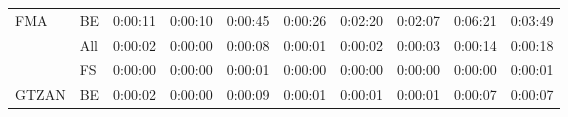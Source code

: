 \begin{table}[H]
{\begin{tabular}{llllllllll}
    \multirow{-3}{*}{FMA}   & \multicolumn{1}{l|}{\cellcolor[HTML]{EFEFEF}BE}  & \cellcolor[HTML]{EFEFEF}0:00:11 & \cellcolor[HTML]{EFEFEF}0:00:10 & \cellcolor[HTML]{EFEFEF}0:00:45 & \cellcolor[HTML]{EFEFEF}0:00:26 & \cellcolor[HTML]{EFEFEF}0:02:20 & \cellcolor[HTML]{EFEFEF}0:02:07 & \cellcolor[HTML]{EFEFEF}0:06:21 & \cellcolor[HTML]{EFEFEF}0:03:49 \\ \cline{1-2}
                            & \multicolumn{1}{l|}{All}                         & 0:00:02                         & 0:00:00                         & 0:00:08                         & 0:00:01                         & 0:00:02                         & 0:00:03                         & 0:00:14                         & 0:00:18                         \\
                            & \multicolumn{1}{l|}{\cellcolor[HTML]{EFEFEF}FS}  & \cellcolor[HTML]{EFEFEF}0:00:00 & \cellcolor[HTML]{EFEFEF}0:00:00 & \cellcolor[HTML]{EFEFEF}0:00:01 & \cellcolor[HTML]{EFEFEF}0:00:00 & \cellcolor[HTML]{EFEFEF}0:00:00 & \cellcolor[HTML]{EFEFEF}0:00:00 & \cellcolor[HTML]{EFEFEF}0:00:00 & \cellcolor[HTML]{EFEFEF}0:00:01 \\
    \multirow{-3}{*}{GTZAN} & \multicolumn{1}{l|}{BE}                          & 0:00:02                         & 0:00:00                         & 0:00:09                         & 0:00:01                         & 0:00:01                         & 0:00:01                         & 0:00:07                         & 0:00:07                        
    \end{tabular}}
\end{table}

